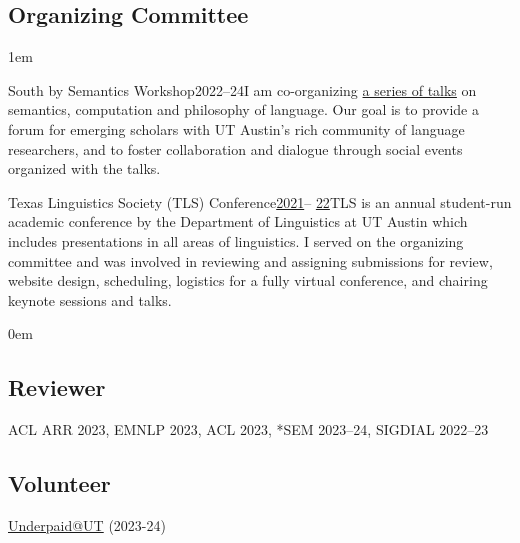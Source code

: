 \subsection{Organizing Committee}

\leftskip1em\relax

\smallentry
  {\large South by Semantics Workshop}{\large 2022--24}{I am co-organizing \href{https://sites.utexas.edu/sxsemantics/}{a series of talks} on semantics, computation and philosophy of language. Our goal is to provide a forum for emerging scholars with UT Austin's rich community of language researchers, and to foster collaboration and dialogue through social events organized with the talks.}
  
\smallentry
    {\large Texas Linguistics Society (TLS) Conference}{\large \href{http://tls.ling.utexas.edu/2021/}{2021}-- \href{http://tls.ling.utexas.edu/2022/}{22}}{TLS is an annual student-run academic conference by the Department of Linguistics at UT Austin which includes presentations in all areas of linguistics. I served on the organizing committee and was involved in reviewing and assigning submissions for review, website design, scheduling, logistics for a fully virtual conference, and chairing keynote sessions and talks.}

\leftskip0em\relax

\subsection{Reviewer}

\quad ACL ARR 2023, EMNLP 2023, ACL 2023, *SEM 2023--24, SIGDIAL 2022--23

\subsection{Volunteer}

\quad \href{http://underpaidatut.org}{Underpaid\makeatletter @\makeatother UT} (2023-24)
